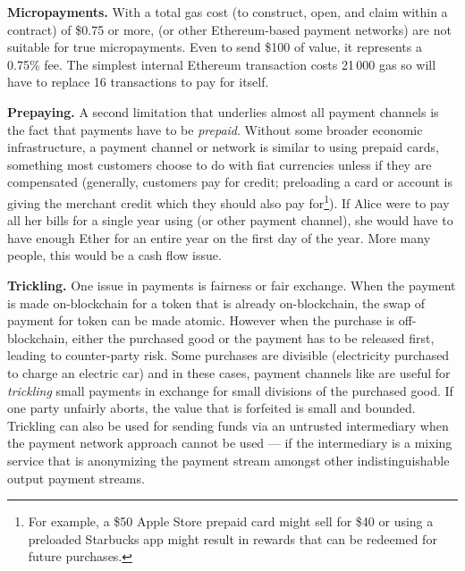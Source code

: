 \textbf{Micropayments.} With a total gas cost (to construct, open, and claim within a contract) of \$0.75 or more, \ew (or other Ethereum-based payment networks) are not suitable for true micropayments. Even to send \$100 of value, it represents a 0.75\% fee. The simplest internal Ethereum transaction costs 21\,000 gas so \ew will have to replace 16 transactions to pay for itself. 

\textbf{Prepaying.} A second limitation that underlies almost all payment channels is the fact that payments have to be \textit{prepaid}. Without some broader economic infrastructure, a payment channel or network is similar to using prepaid cards, something most customers choose to do with fiat currencies unless if they are  compensated (generally, customers pay for credit; preloading a card or account is giving the merchant credit which they should also pay for\footnote{For example, a \$50 Apple Store prepaid card might sell for \$40 or using a preloaded Starbucks app might result in rewards that can be redeemed for future purchases.}). If Alice were to pay all her bills for a single year using \ew (or other payment channel), she would have to have enough Ether for an entire year on the first day of the year. More many people, this would be a cash flow issue. 

\textbf{Trickling.} One issue in payments is fairness or fair exchange. When the payment is made on-blockchain for a token that is already on-blockchain, the swap of payment for token can be made atomic. However when the purchase is off-blockchain, either the purchased good or the payment has to be released first, leading to counter-party risk. Some purchases are divisible (\eg electricity purchased to charge an electric car) and in these cases, payment channels like \ew are useful for \textit{trickling} small payments in exchange for small divisions of the purchased good. If one party unfairly aborts, the value that is forfeited is small and bounded. Trickling can also be used for sending funds via an untrusted intermediary when the payment network approach cannot be used --- \eg if the intermediary is a mixing service that is anonymizing the payment stream amongst other indistinguishable output payment streams.



